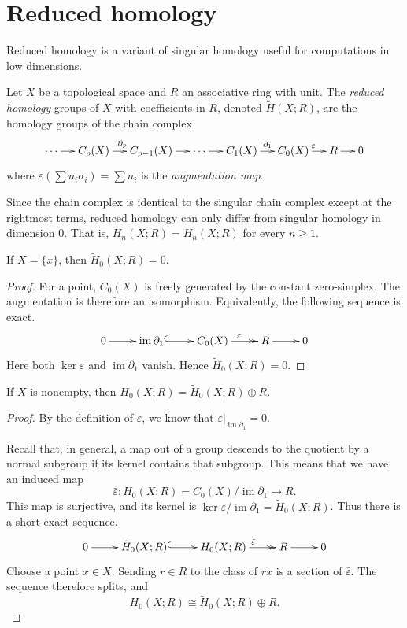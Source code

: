 \section{Reduced
homology}\label{section-reduced-homology}

Reduced homology is a variant of singular
homology useful for
computations in low dimensions.

\begin{definition}
Let $X$ be a topological space and $R$ an
associative ring
with unit. The \emph{reduced homology} groups
of $X$ with
coefficients in $R$, denoted $\tilde H(X;R)$,
are the
homology groups of the chain complex
$$
\xymatrix@C=1.25em{
\cdots \ar[r]
 & C_p(X) \ar[r]^{\partial_p}
 & C_{p-1}(X) \ar[r]
 & \cdots \ar[r]
 & C_1(X) \ar[r]^{\partial_1}
 & C_0(X) \ar[r]^{\varepsilon}
 & R \ar[r]
 & 0
}
$$
where
$\varepsilon(\sum n_i\sigma_i)=\sum n_i$ is
the
\emph{augmentation map}.
\end{definition}

\begin{remark}
Since the chain complex is identical to the
singular chain
complex except at the rightmost terms,
reduced homology can
only differ from singular homology in
dimension 0. That is,
$\tilde H_n(X;R)=H_n(X;R)$ for every
$n\geq1$.
\end{remark}

\begin{exercise}
If $X=\{x\}$, then $\tilde H_0(X;R)=0$.
\end{exercise}

\begin{proof}
For a point, $C_0(X)$ is freely generated by
the constant zero-simplex. The augmentation
is
therefore an isomorphism. Equivalently, the
following sequence is exact.
$$
\xymatrix{
0 \ar[r]
 & \operatorname{im}\partial_1
   \ar@{^{(}->}[r]
 & C_0(X) \ar@{->>}[r]^{\varepsilon}
 & R \ar[r]
 & 0
}
$$
Here both $\ker\varepsilon$ and
$\operatorname{im}\partial_1$ vanish. Hence
$\tilde H_0(X;R)=0$.
\end{proof}

\begin{exercise}
If $X$ is nonempty, then
$H_0(X;R)=\tilde H_0(X;R)\oplus R$.
\end{exercise}

\begin{proof}
By the definition of $\varepsilon$, we know
that
$\varepsilon|_{
\operatorname{im}\partial_1}=0$.

Recall that, in general, a map out of a group
descends to the
quotient by a normal subgroup if its kernel
contains that
subgroup. This means that we have an induced
map
$$
\bar\varepsilon:H_0(X;R)
=C_0(X)/\operatorname{im}\partial_1
\longrightarrow
R.
$$
This map is surjective, and its kernel is
$\ker\varepsilon/\operatorname{im}\partial_1
=\tilde H_0(X;R)$. Thus there is a short
exact
sequence.
$$
\xymatrix{
0 \ar[r]
 & \tilde H_0(X;R) \ar@{^{(}->}[r]
 & H_0(X;R) \ar@{->>}[r]^
   {\bar\varepsilon}
 & R \ar[r]
 & 0
}
$$
Choose a point $x\in X$. Sending $r\in R$ to
the class of $r x$ is a section of
$\bar\varepsilon$. The sequence therefore
splits, and
$$
H_0(X;R)\cong\tilde H_0(X;R)\oplus R.
$$
\end{proof}
